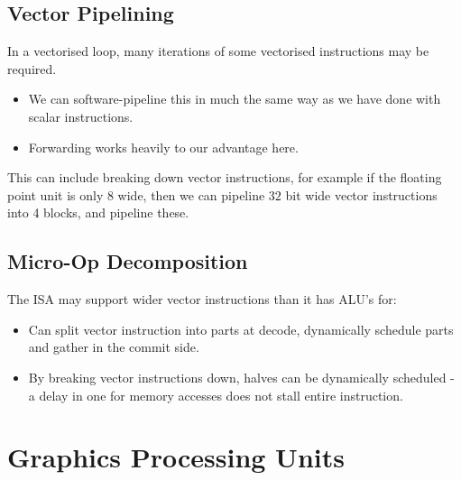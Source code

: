 \subsection{Vector Pipelining}
In a vectorised loop, many iterations of some vectorised instructions may be required.
\begin{itemize}
    \item We can software-pipeline this in much the same way as we have done with scalar instructions.
    \item Forwarding works heavily to our advantage here.
\end{itemize}
This can include breaking down vector instructions, for example if the floating point unit is only $8$ wide, then we can pipeline $32$ bit wide vector instructions into 4 blocks, and pipeline these.

\subsection{Micro-Op Decomposition}
The ISA may support wider vector instructions than it has ALU's for:
\begin{itemize}
    \item Can split vector instruction into parts at decode, dynamically schedule parts and gather in the commit side.
    \item By breaking vector instructions down, halves can be dynamically scheduled - a delay in one for memory accesses does not stall entire instruction.
\end{itemize}

\section{Graphics Processing Units}

\unfinished

